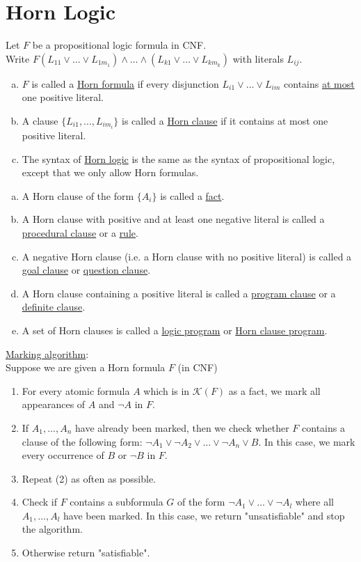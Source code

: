 \documentclass[a4paper]{article}
\newcommand{\ul}{\underline}
\begin{document}
\section{Horn Logic}
Let $F$ be a propositional logic formula in CNF.\\
Write $F(L_{11}\vee\dots\vee L_{1m_1})\wedge\dots\wedge(L_{k1}\vee\dots\vee L_{km_k})$ with literals $L_{ij}$.
\begin{enumerate}[(a)]
	\item $F$ is called a \ul{Horn formula} if every disjunction $L_{i1}\vee\dots\vee L_{im}$ contains \ul{at most} one positive literal.
	\item A clause $\{L_{i1},\dots,L_{im_i}\}$ is called a \ul{Horn clause} if it contains at most one positive literal.
	\item The syntax of \ul{Horn logic} is the same as the syntax of propositional logic, except that we only allow Horn formulas.
\end{enumerate}
\begin{enumerate}[(a)]
	\item A Horn clause of the form $\{A_i\}$ is called a \ul{fact}.
	\item A Horn clause with positive and at least one negative literal is called a \ul{procedural clause} or a \ul{rule}.
	\item A negative Horn clause (i.e. a Horn clause with no positive literal) is called a \ul{goal clause} or \ul{question clause}.
	\item A Horn clause containing a positive literal is called a \ul{program clause} or a \ul{definite clause}.
	\item A set of Horn clauses is called a \ul{logic program} or \ul{Horn clause program}.
\end{enumerate}
\ul{Marking algorithm}:\\
Suppose we are given a Horn formula $F$ (in CNF)
\begin{enumerate}[(1)]
	\item For every atomic formula $A$ which is in $\mathcal{K}(F)$ as a fact, we mark all appearances of $A$ and $\neg A$ in $F$.
	\item If $A_1,\dots,A_n$ have already been marked, then we check whether $F$ contains a clause of the following form: $\neg A_1\vee\neg A_2\vee\dots\vee\neg A_n\vee B$. In this case, we mark every occurrence of $B$ or $\neg B$ in $F$.
	\item Repeat (2) as often as possible.
	\item Check if $F$ contains a subformula $G$ of the form $\neg A_1\vee\dots\vee\neg A_l$ where all $A_1,\dots,A_l$ have been marked. In this case, we return "unsatisfiable" and stop the algorithm.
	\item Otherwise return "satisfiable".
\end{enumerate}
\end{document}
